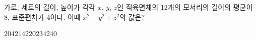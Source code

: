가로, 세로의 길이, 높이가 각각 $x$, $y$, $z$인 직육면체의 12개의 모서리의 길이의 평균이 8, 표준편차가 4이다. 이때 $x^2+y^2+z^2$의 값은?
\begin{choices32}{$204$}{$214$}{$220$}{$234$}{$240$}\end{choices32}
